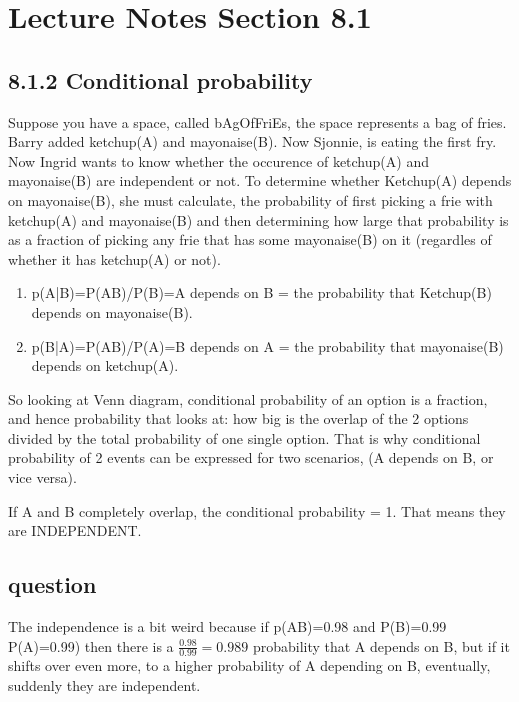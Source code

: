 \section{Lecture Notes Section 8.1}\label{sec:model_explanation}
\subsection{8.1.2 Conditional probability}
Suppose you have a space, called bAgOfFriEs, the space represents a bag of fries. Barry added ketchup(A) and mayonaise(B). Now Sjonnie, is eating the first fry. Now Ingrid wants to know whether the occurence of ketchup(A) and mayonaise(B) are independent or not. To determine whether Ketchup(A) depends on mayonaise(B), she must calculate, the probability of first picking a frie with ketchup(A) and mayonaise(B) and then determining how large that probability is as a fraction of picking any frie that has some mayonaise(B) on it (regardles of whether it has ketchup(A) or not).
\begin{enumerate}
    \item p(A|B)=P(AB)/P(B)=A depends on B = the probability that Ketchup(B) depends on mayonaise(B).
    \item p(B|A)=P(AB)/P(A)=B depends on A = the probability that mayonaise(B) depends on ketchup(A).
\end{enumerate}
So looking at Venn diagram, conditional probability of an option is a fraction, and hence probability that looks at: how big is the overlap of the 2 options divided by the total probability of one single option. That is why conditional probability of 2 events can be expressed for two scenarios, (A depends on B, or vice versa).


If A and B completely overlap, the conditional probability = 1. That means they are INDEPENDENT. 
\subsection{question}
The independence is a bit weird because if p(AB)=0.98 and P(B)=0.99 {P(A)=0.99)} then there is a $\frac{0.98}{0.99}=0.989$ probability that A depends on B, but if it shifts over even more, to a higher probability of A depending on B, eventually, suddenly they are independent.

